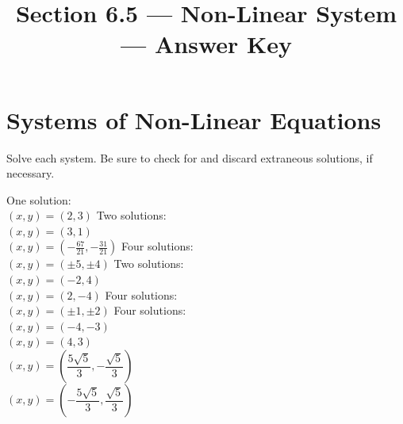 

\title{Section 6.5 --- Non-Linear System --- Answer Key}

\newcommand{\pair}[2][x,y]{%
\ensuremath{(#1)=\left(#2\right)}%
}


\maketitle

\section*{Systems of Non-Linear Equations}
Solve each system. Be sure to check for and discard extraneous solutions, if necessary.
\begin{smenum}
\mitemxx
{One solution:\\\pair{2,3}}
{Two solutions:\\\pair{3,1}\\\pair{-\frac{67}{21},-\frac{31}{21}}}
\mitemxx
{Four solutions:\\\pair{\pm 5,\pm 4}}
{Two solutions:\\\pair{-2,4}\\\pair{2,-4}}
\mitemxx
{Four solutions:\\\pair{\pm 1,\pm 2}}
{Four solutions:\\
\pair{-4,-3}\\
\pair{4,3}\\
\pair{\dfrac{5\sqrt{5}}{3},-\dfrac{\sqrt{5}}{3}}\\
\pair{-\dfrac{5\sqrt{5}}{3},\dfrac{\sqrt{5}}{3}}}
\end{smenum}

